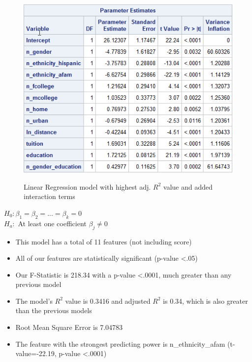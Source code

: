 \documentclass[12pt]{article}
\begin{document}
\begin{figure}[h]
\begin{minipage}[t]{0.55\textwidth}
        \includegraphics[width=\textwidth]{images/final_model2.png}
        
        \label{fig:unemp_measures}
    \end{minipage}
    \caption{Linear Regression model with highest adj. $R^{2}$ value and added interaction terms}
    \label{fig:unemp_fig}
\end{figure}

 \large\noindent $H_{0}: \beta_1 = \beta_2 = ... = \beta_k = 0$\\
 $H_a:$ At least one coefficient $\beta_j \ne 0$ 
  \normalsize
\begin{itemize}
    \item This model has a total of 11 features (not including score)
    \item All of our features are statistically significant (p-value \textless .05)
    \item Our F-Statistic is 218.34 with a p-value \textless .0001, much greater than any previous model
    \item The model's $R^2$ value is 0.3416 and adjusted $R^2$ is 0.34, which is also greater than the previous models
    \item Root Mean Square Error is 7.04783
    \item The feature with the strongest predicting power is n\_ethnicity\_afam (t-value=-22.19, p-value \textless .0001)
\end{itemize}
\end{document}
